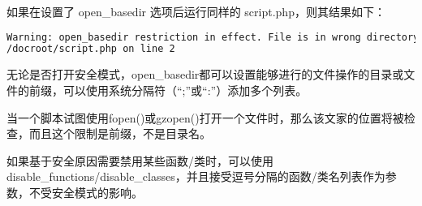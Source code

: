 如果在设置了 open\_basedir 选项后运行同样的 script.php，则其结果如下：

\begin{lstlisting}[language=bash]
Warning: open_basedir restriction in effect. File is in wrong directory in
/docroot/script.php on line 2
\end{lstlisting}


无论是否打开安全模式，open\_basedir都可以设置能够进行的文件操作的目录或文件的前缀，可以使用系统分隔符（“;”或“:”）添加多个列表。

当一个脚本试图使用fopen()或gzopen()打开一个文件时，那么该文家的位置将被检查，而且这个限制是前缀，不是目录名。

如果基于安全原因需要禁用某些函数/类时，可以使用disable\_functions/disable\_classes，并且接受逗号分隔的函数/类名列表作为参数，不受安全模式的影响。



















































































